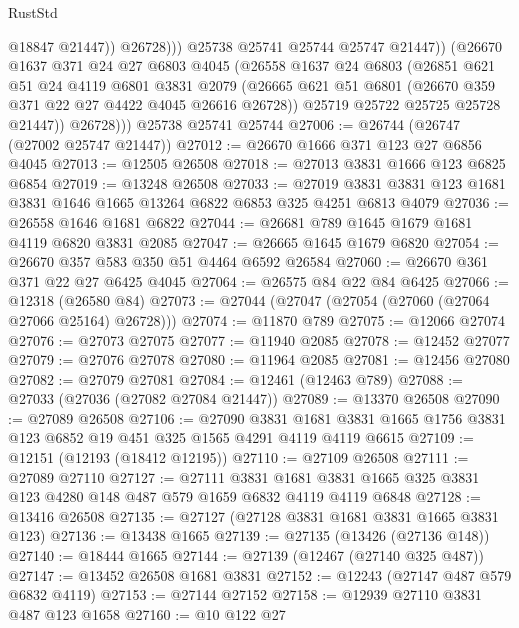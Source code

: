 \begin{lexlean}{RustStd}
\begin{coremodule}
                      @18847
                      @21447))
                  @26728)))
            @25738
            @25741
            @25744
            @25747
            @21447))
        (@26670
          @1637
          @371
          @24
          @27
          @6803
          @4045
          (@26558
            @1637
            @24
            @6803
            (@26851
              @621
              @51
              @24
              @4119
              @6801
              @3831
              @2079
              (@26665 @621 @51 @6801 (@26670 @359 @371 @22 @27 @4422 @4045 @26616 @26728))
              @25719
              @25722
              @25725
              @25728
              @21447))
          @26728)))
    @25738
    @25741
    @25744
@27006 := @26744 (@26747 (@27002 @25747 @21447))
@27012 := @26670 @1666 @371 @123 @27 @6856 @4045
@27013 := @12505 @26508
@27018 := @27013 @3831 @1666 @123 @6825 @6854
@27019 := @13248 @26508
@27033 := @27019 @3831 @3831 @123 @1681 @3831 @1646 @1665 @13264 @6822 @6853 @325 @4251 @6813 @4079
@27036 := @26558 @1646 @1681 @6822
@27044 := @26681 @789 @1645 @1679 @1681 @4119 @6820 @3831 @2085
@27047 := @26665 @1645 @1679 @6820
@27054 := @26670 @357 @583 @350 @51 @4464 @6592 @26584
@27060 := @26670 @361 @371 @22 @27 @6425 @4045
@27064 := @26575 @84 @22 @84 @6425
@27066 := @12318 (@26580 @84)
@27073 := @27044 (@27047 (@27054 (@27060 (@27064 @27066 @25164) @26728)))
@27074 := @11870 @789
@27075 := @12066 @27074
@27076 := @27073 @27075
@27077 := @11940 @2085
@27078 := @12452 @27077
@27079 := @27076 @27078
@27080 := @11964 @2085
@27081 := @12456 @27080
@27082 := @27079 @27081
@27084 := @12461 (@12463 @789)
@27088 := @27033 (@27036 (@27082 @27084 @21447))
@27089 := @13370 @26508
@27090 := @27089 @26508
@27106 := @27090
    @3831
    @1681
    @3831
    @1665
    @1756
    @3831
    @123
    @6852
    @19
    @451
    @325
    @1565
    @4291
    @4119
    @4119
    @6615
@27109 := @12151 (@12193 (@18412 @12195))
@27110 := @27109 @26508
@27111 := @27089 @27110
@27127 := @27111
    @3831
    @1681
    @3831
    @1665
    @325
    @3831
    @123
    @4280
    @148
    @487
    @579
    @1659
    @6832
    @4119
    @4119
    @6848
@27128 := @13416 @26508
@27135 := @27127 (@27128 @3831 @1681 @3831 @1665 @3831 @123)
@27136 := @13438 @1665
@27139 := @27135 (@13426 (@27136 @148))
@27140 := @18444 @1665
@27144 := @27139 (@12467 (@27140 @325 @487))
@27147 := @13452 @26508 @1681 @3831
@27152 := @12243 (@27147 @487 @579 @6832 @4119)
@27153 := @27144 @27152
@27158 := @12939 @27110 @3831 @487 @123 @1658
@27160 := @10 @122 @27

\end{coremodule}
\end{lexlean}
